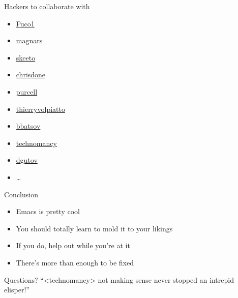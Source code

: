 \documentclass[presentation]{beamer}
\begin{document}
\begin{frame}[label=sec-7-5]{Hackers to collaborate with}
\begin{itemize}
\item \href{https://github.com/Fuco1}{Fuco1}
\item \href{https://github.com/magnars}{magnars}
\item \href{https://github.com/skeeto}{skeeto}
\item \href{https://github.com/chrisdone}{chrisdone}
\item \href{https://github.com/purcell}{purcell}
\item \href{https://github.com/thierryvolpiatto}{thierryvolpiatto}
\item \href{https://github.com/bbatsov}{bbatsov}
\item \href{https://github.com/technomancy}{technomancy}
\item \href{https://github.com/dgutov}{dgutov}
\item \ldots{}
\end{itemize}
\end{frame}

\begin{frame}[label=sec-7-6]{Conclusion}
\begin{itemize}
\item Emacs is pretty cool
\item You should totally learn to mold it to your likings
\item If you do, help out while you're at it
\item There's more than enough to be fixed
\end{itemize}
\end{frame}

\begin{frame}[label=sec-7-7]{Questions?}
“<technomancy> not making sense never stopped an intrepid elisper!”
\end{frame}
\end{document}
